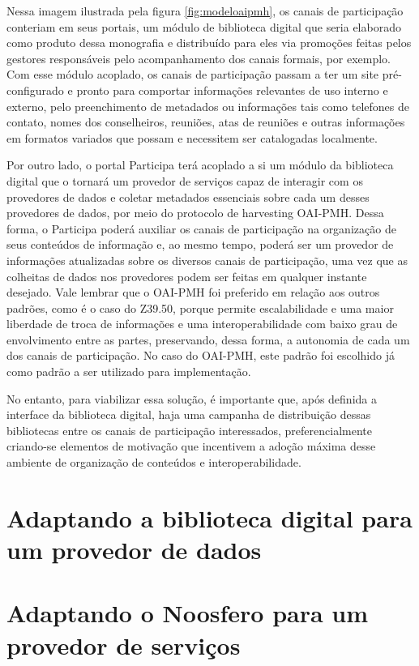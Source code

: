 Nessa imagem ilustrada pela figura \ref{fig:modeloaipmh}, os canais de participação conteriam em seus portais, um módulo de biblioteca digital que seria elaborado como produto dessa monografia e distribuído para eles via promoções feitas pelos gestores responsáveis pelo acompanhamento dos canais formais, por exemplo. Com esse módulo acoplado, os canais de participação passam a ter um site pré-configurado e pronto para comportar informações relevantes de uso interno e externo, pelo preenchimento de metadados ou informações tais como telefones de contato, nomes dos conselheiros, reuniões, atas de reuniões e outras informações em formatos variados que possam e necessitem ser catalogadas localmente.

Por outro lado, o portal Participa terá acoplado a si um módulo da biblioteca digital que o tornará um provedor de serviços capaz de interagir com os provedores de dados e coletar metadados essenciais sobre cada um desses provedores de dados, por meio do protocolo de harvesting OAI-PMH. Dessa forma, o Participa poderá auxiliar os canais de participação na organização de seus conteúdos de informação e, ao mesmo tempo, poderá ser um provedor de informações atualizadas sobre os diversos canais de participação, uma vez que as colheitas de dados nos provedores podem ser feitas em qualquer instante desejado. Vale lembrar que o OAI-PMH foi preferido em relação aos outros padrões, como é o caso do Z39.50, porque permite escalabilidade e uma maior liberdade de troca de informações e uma interoperabilidade com baixo grau de envolvimento entre as partes, preservando, dessa forma, a autonomia de cada um dos canais de participação. No caso do OAI-PMH, este padrão foi escolhido já como padrão a ser utilizado para implementação. 

No entanto, para viabilizar essa solução, é importante que, após definida a interface da biblioteca digital, haja uma campanha de distribuição dessas bibliotecas entre os canais de participação interessados, preferencialmente criando-se elementos de motivação que incentivem a adoção máxima desse ambiente de organização de conteúdos e interoperabilidade.

\section{Adaptando a biblioteca digital para um provedor de dados}

\section{Adaptando o Noosfero para um provedor de serviços}

